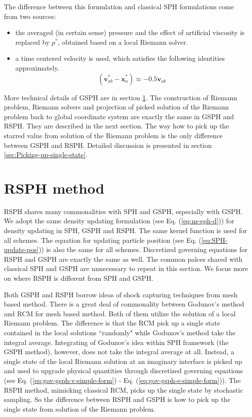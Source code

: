 The difference between this formulation and classical SPH formulations come from two sources: 
\begin{itemize}
\item the averaged (in certain sense) pressure and the effect of artificial viscosity is replaced by  $p^{\ast}$, obtained based on a local Riemann solver.
\item a time centered velocity is used, which satisfies the following identities approximately. 
\begin{equation}
\left( \textbf{v}_{a b}^{\ast} - \dot{\textbf{x}}_{a}^{\ast} \right) \approx -0.5 \textbf{v}_{a b}
\label{eq:SPH-GSPH-difference2}
\end{equation}
\end{itemize}

More technical details of GSPH are in section \ref{sec:RSPH-method}. The construction of Riemann problem, Riemann solvers and projection of picked solution of the Riemann problem back to global coordinate system are exactly the same in GSPH and RSPH. They are described in the next section. The way how to pick up the starred value from solution of the Riemann problem is the only difference between GSPH and RSPH. Detailed discussion is presented in section \ref{sec:Picking-up-single-state}. 

\section{RSPH method} \label{sec:RSPH-method}
RSPH shares many commonalities with SPH and GSPH, especially with GSPH. We adopt the same density updating formulation (see Eq. (\ref{eq:ns-sph-d})) for density updating in SPH, GSPH and RSPH. The same kernel function is used for all schemes. The equation for updating particle position (see Eq. (\ref{eq:SPH-update-pos})) is also the same for all schemes. Discretized governing equations for RSPH and GSPH are exactly the same as well. The common palces shared with classical SPH and GSPH are unnecessary to repeat in this section. We focus more on where RSPH is different from SPH and GSPH.

Both GSPH and RSPH borrow ideas of shock capturing techniques from mesh based method. There is a great deal of commonality between Godunov's method and RCM for mesh based method. Both of them utilize the solution of a local Riemann problem. The difference is that the RCM pick up a single state contained in the local solutions ``randomly" while Godunov's method take the integral average. 
Integrating of Godunov's idea within SPH framework (the GSPH method), however, does not take the integral average at all. Instead, a single state of the local Riemann solution at an imaginary interface is picked up and used to upgrade physical quantities through discretized governing equations (see Eq. (\ref{eq:gov-gsph-v-simple-form}) - Eq. (\ref{eq:gov-gsph-e-simple-form})). The RSPH method, mimicking classical RCM, picks up the single state by stochastic sampling. So the difference between RSPH and GSPH is how to pick up the single state from solution of the Riemann problem.

